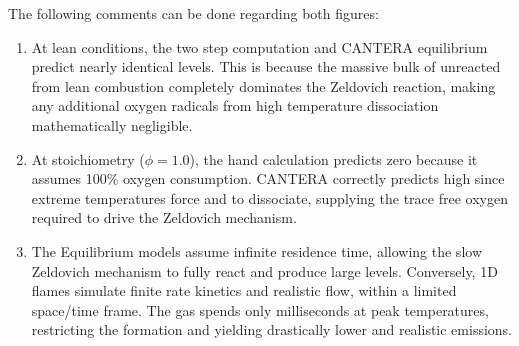 The following comments can be done regarding both figures:

\begin{enumerate}[label=(\roman*)]
    \item At lean conditions, the two step computation and CANTERA equilibrium predict nearly identical  levels. This is because the massive bulk of unreacted  from lean combustion completely dominates the Zeldovich reaction, making any additional oxygen radicals from high temperature dissociation mathematically negligible.
    \item At stoichiometry ($\phi = 1.0$), the hand calculation predicts zero  because it assumes 100\% oxygen consumption. CANTERA correctly predicts high  since extreme temperatures force  and  to dissociate, supplying the trace free oxygen required to drive the Zeldovich mechanism.
    \item The Equilibrium models assume infinite residence time, allowing the slow Zeldovich mechanism to fully react and produce large  levels. Conversely, 1D flames simulate finite rate kinetics and realistic flow, within a limited space/time frame. The gas spends only milliseconds at peak temperatures, restricting the  formation and yielding drastically lower and realistic emissions.
\end{enumerate}
